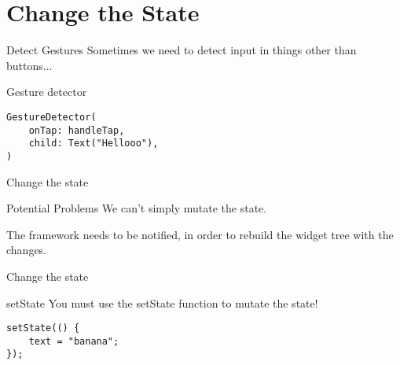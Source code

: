 \section{Change the State}

\begin{frame}[containsverbatim]{Detect Gestures}
    Sometimes we need to detect input in things other than buttons...
    
    \begin{block}{Gesture detector}
        \begin{verbatim}
GestureDetector(
    onTap: handleTap,
    child: Text("Hellooo"),
)
        \end{verbatim}
    \end{block}
\end{frame}

\begin{frame}[containsverbatim]{Change the state}
    \begin{alertblock}{Potential Problems}
		We can't simply mutate the state.

        The framework needs to be notified, in order to rebuild the widget tree with the changes.
	\end{alertblock}
    
\end{frame}

\begin{frame}[containsverbatim]{Change the state}
    \begin{alertblock}{setState}
		You must use the setState function to mutate the state!

        \begin{verbatim}
setState(() {
    text = "banana";
});
        \end{verbatim}
	\end{alertblock}
    
\end{frame}
